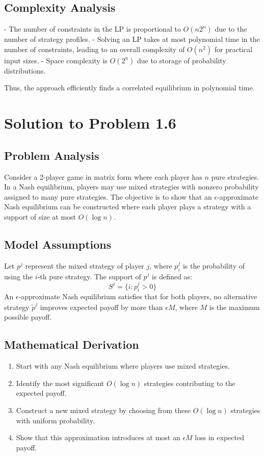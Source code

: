 \documentclass{article}
\begin{document}
\subsection*{Complexity Analysis}

- The number of constraints in the LP is proportional to $O(n 2^n)$ due to the number of strategy profiles.
- Solving an LP takes at most polynomial time in the number of constraints, leading to an overall complexity of $O(n^2)$ for practical input sizes.
- Space complexity is $O(2^n)$ due to storage of probability distributions.

Thus, the approach efficiently finds a correlated equilibrium in polynomial time.

\section*{Solution to Problem 1.6}

\subsection*{Problem Analysis}
Consider a 2-player game in matrix form where each player has $n$ pure strategies. In a Nash equilibrium, players may use mixed strategies with nonzero probability assigned to many pure strategies. The objective is to show that an $\epsilon$-approximate Nash equilibrium can be constructed where each player plays a strategy with a support of size at most $O(\log n)$.

\subsection*{Model Assumptions}
Let $p^j$ represent the mixed strategy of player $j$, where $p_i^j$ is the probability of using the $i$-th pure strategy. The support of $p^j$ is defined as:
\[
S^j = \{ i : p_i^j > 0 \}
\]
An $\epsilon$-approximate Nash equilibrium satisfies that for both players, no alternative strategy $\tilde{p}^j$ improves expected payoff by more than $\epsilon M$, where $M$ is the maximum possible payoff.

\subsection*{Mathematical Derivation}
\begin{enumerate}
    \item Start with any Nash equilibrium where players use mixed strategies.
    \item Identify the most significant $O(\log n)$ strategies contributing to the expected payoff.
    \item Construct a new mixed strategy by choosing from these $O(\log n)$ strategies with uniform probability.
    \item Show that this approximation introduces at most an $\epsilon M$ loss in expected payoff.
\end{enumerate}
\end{document}
